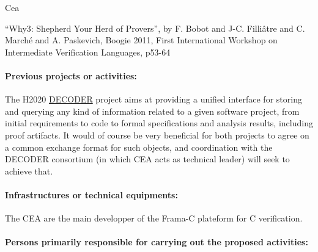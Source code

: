 \begin{sitedescription}{Cea}

\begin{compactitem}
\item ``Why3: Shepherd Your Herd of Provers'', by F. Bobot and J-C. Filli\^atre and
C. March\'e and A. Paskevich, Boogie 2011, First International Workshop on
Intermediate Verification Languages, p53-64
\end{compactitem}

\paragraph*{Previous projects or activities:}


\begin{compactitem}
\item The H2020 \href{https://www.decoder-project.eu}{DECODER} project aims at
providing a unified interface for storing and querying any kind of
information related to a given software project, from initial
requirements to code to formal specifications and analysis results,
including proof artifacts. It would of course be very beneficial for
both projects to agree on a common exchange format for such objects, and
coordination with the DECODER consortium (in which CEA acts as technical
leader) will seek to achieve that.
\end{compactitem}

\paragraph*{Infrastructures or technical equipments:}


\begin{compactitem}
\item The CEA are the main developper of the Frama-C plateform for C verification.
\end{compactitem}

\paragraph*{Persons primarily responsible for carrying out the proposed activities:}


\end{sitedescription}
